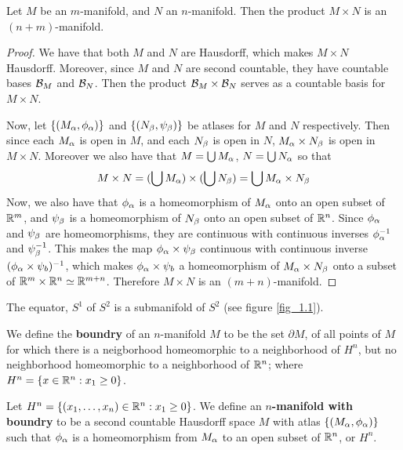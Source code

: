 \begin{lemma}\label{1.1.2}
    Let $M$ be an  $m$-manifold, and  $N$ an  $n$-manifold. Then the product $M
    \times N$ is an $(n+m)$-manifold.
\end{lemma}
\begin{proof}
    We have that both $M$ and  $N$ are Hausdorff, which makes  $M \times N$
    Hausdorff. Moreover, since  $M$ and  $N$ are second countable, they have
    countable bases  $\mathcal{B}_M$ and  $\mathcal{B}_N$. Then the product  $\mathcal{B}_M \times
    \mathcal{B}_N$ serves as a countable basis for  $M \times N$.

    Now, let  $\{(M_\alpha, \phi_\alpha)\}$ and $\{(N_\beta, \psi_\beta)\}$ be atlases for $M$
    and  $N$ respectively. Then since each $M_\alpha$ is open in  $M$, and each
    $N_\beta$ is open in  $N$,  $M_\alpha \times N_\beta$ is open in  $M \times N$.
    Moreover we also have that  $M=\bigcup{M_\alpha}$, $N=\bigcup{N_\alpha}$ so that
    \begin{equation*}
        M \times N=(\bigcup{M_\alpha}) \times (\bigcup{N_\beta})=\bigcup{M_\alpha\times
        N_\beta}
    \end{equation*}
    Now, we also have that $\phi_\alpha$ is a homeomorphism of  $M_\alpha$ onto an open
    subset of $\mathbb{R}^m$, and  $\psi_\beta$ is a homeomorphism of  $N_\beta$ onto an open
    subset of  $\mathbb{R}^n$. Since  $\phi_\alpha$ and  $\psi_\beta$ are homeomorphisms, they
    are continuous with continuous inverses  $\phi_\alpha^{-1}$ and
    $\psi_\beta^{-1}$. This makes the map $\phi_\alpha \times \psi_\beta$ continuous with
    continuous inverse $(\phi_\alpha \times \psi_b)^{-1}$, which makes $\phi_\alpha
    \times \psi_b$ a homeomorphism of $M_\alpha \times N_\beta$ onto a subset of $\mathbb{R}^m
    \times \mathbb{R}^n \simeq \mathbb{R}^{m+n}$. Therefore $M \times N$ is an
    $(m+n)$-manifold.
\end{proof}

\begin{example}\label{example_1.2}
    The equator, $S^1$ of  $S^2$ is a submanifold of  $S^2$  (see figure
    \ref{fig_1.1}).
\end{example}

\begin{definition}
    We define the \textbf{boundry} of an $n$-manifold $M$ to be the set
    $\partial{M}$, of all points of $M$ for which there is a neigborhood
    homeomorphic to a neighborhood of $H^n$, but no neighborhood homeomorphic to
    a neighborhood of $\mathbb{R}^n$; where $H^n=\{x \in \mathbb{R}^n : x_1 \geq 0\}$.
\end{definition}

\begin{definition}
    Let $H^n=\{(x_1, \dots, x_n) \in \mathbb{R}^n : x_1 \geq 0\}$. We define an
   \textbf{$n$-manifold with boundry}  to be a second countable Hausdorff space
   $M$ with atlas  $\{(M_\alpha,\phi_\alpha)\}$ such that $\phi_\alpha$ is a homeomorphism
   from  $M_\alpha$ to an open subset of  $\mathbb{R}^n$, or $H^n$.
\end{definition}

